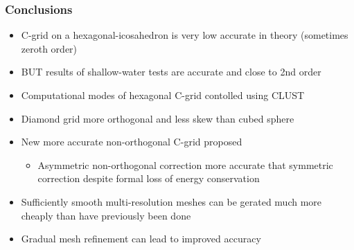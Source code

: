 \begin{frame}
\frametitle{Conclusions}

\begin{itemize}[<+->]

\item C-grid on a hexagonal-icosahedron is very low accurate in theory (sometimes zeroth order)

\item BUT results of shallow-water tests are accurate and close to 2nd order

\item Computational modes of hexagonal C-grid contolled using CLUST

\item Diamond grid more orthogonal and less skew than cubed sphere

\item New more accurate non-orthogonal C-grid proposed
\begin{itemize}
\item Asymmetric non-orthogonal correction more accurate that symmetric correction despite formal loss of energy conservation
\end{itemize}

\item Sufficiently smooth multi-resolution meshes can be gerated much more cheaply than have previously been done

\item Gradual mesh refinement can lead to improved accuracy

\end{itemize}

\end{frame}

